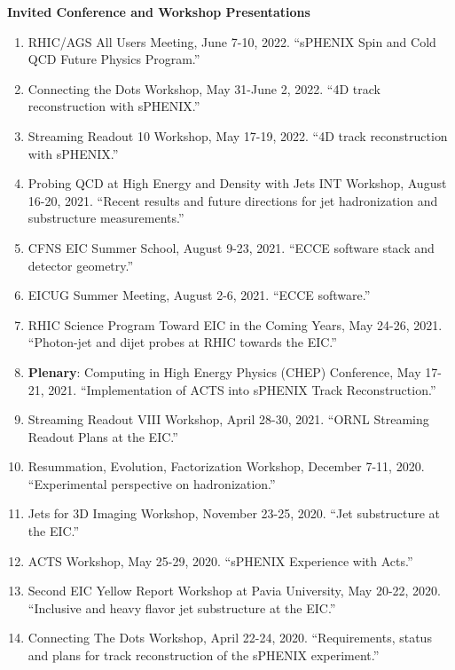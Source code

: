 \documentclass[11pt]{article}
\begin{document}

\vspace{7pt}
\begin{flushleft}
	\LARGE\textbf{Invited Conference and Workshop Presentations}
	\normalsize
	\begin{enumerate}
		\item RHIC/AGS All Users Meeting, June 7-10, 2022. ``sPHENIX Spin and Cold QCD Future Physics Program.''
		\item Connecting the Dots Workshop, May 31-June 2, 2022. ``4D track reconstruction with sPHENIX.''
		\item Streaming Readout 10 Workshop, May 17-19, 2022. ``4D track reconstruction with sPHENIX.''
		\item Probing QCD at High Energy and Density with Jets INT Workshop, August 16-20, 2021. ``Recent results and future directions for jet hadronization and substructure measurements.''
		\item CFNS EIC Summer School, August 9-23, 2021. ``ECCE software stack and detector geometry.'' 
		\item EICUG Summer Meeting, August 2-6, 2021. ``ECCE software.''
		\item RHIC Science Program Toward EIC in the Coming Years, May 24-26, 2021. ``Photon-jet and dijet probes at RHIC towards the EIC.''
		\item {\bf{Plenary}}: Computing in High Energy Physics (CHEP) Conference, May 17-21, 2021. ``Implementation of ACTS into sPHENIX Track Reconstruction.''
		\item Streaming Readout VIII Workshop, April 28-30, 2021. ``ORNL Streaming Readout Plans at the EIC.''\\
		\item Resummation, Evolution, Factorization Workshop, December 7-11, 2020. ``Experimental perspective on hadronization.''
		\item Jets for 3D Imaging Workshop, November 23-25, 2020. ``Jet substructure at the EIC.''
		\item ACTS Workshop, May 25-29, 2020. ``sPHENIX Experience with Acts.''
		\item Second EIC Yellow Report Workshop at Pavia University, May 20-22, 2020. ``Inclusive and heavy flavor jet substructure at the EIC.''
		\item Connecting The Dots Workshop, April 22-24, 2020. ``Requirements, status and plans for track reconstruction of the sPHENIX experiment.''

\end{enumerate}
\end{flushleft}
\end{document}
